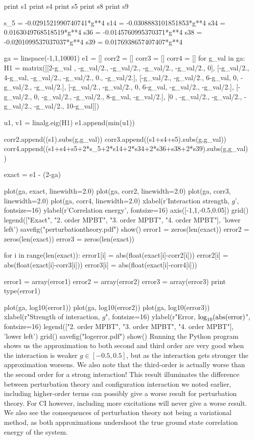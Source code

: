 \documentclass[%
twoside,                 %
final,                   %
10pt]{article}
\newenvironment{doconceexercise}{}{}
\begin{document}
\begin{doconceexercise}
print s1
print s4
print s5
print s8
print s9

s_5 =  -0.0291521990740741*g**4
s14 =  -0.0308883101851853*g**4
s34 =  0.0163049768518519*g**4
s36 =  -0.0145760995370371*g**4
s38 =  -0.0201099537037037*g**4
s39 =  0.0176938657407407*g**4

ga = linspace(-1,1,10001)
e1 = []
corr2 = []
corr3 = []
corr4 = []
for g_val in ga:
	H1 = matrix([[2-g_val , -g_val/2.,  -g_val/2., -g_val/2., -g_val/2.,     0], 
		        [-g_val/2.,   4-g_val,  -g_val/2., -g_val/2.,    0., -g_val/2.],
		        [-g_val/2., -g_val/2.,    6-g_val,     0, -g_val/2., -g_val/2.],
				[-g_val/2., -g_val/2.,      0,   6-g_val, -g_val/2., -g_val/2.],
				[-g_val/2.,     0,  -g_val/2., -g_val/2.,   8-g_val, -g_val/2.],
				[0    , -g_val/2.,  -g_val/2., -g_val/2., -g_val/2.,  10-g_val]]) 

	u1, v1 = linalg.eig(H1)
	e1.append(min(u1))

	corr2.append((s1).subs(g,g_val))
	corr3.append((s1+s4+s5).subs(g,g_val))
	corr4.append((s1+s4+s5+2*s_5+2*s14+2*s34+2*s36+s38+2*s39).subs(g,g_val))

exact = e1 - (2-ga)

plot(ga, exact, linewidth=2.0)
plot(ga, corr2, linewidth=2.0)
plot(ga, corr3, linewidth=2.0)
plot(ga, corr4, linewidth=2.0)
xlabel(r'Interaction strength, $g$', fontsize=16)
ylabel(r'Correlation energy', fontsize=16)
axis([-1,1,-0.5,0.05])
grid()
legend(["Exact", "2. order MPBT", "3. order MPBT", "4. order MPBT"], 'lower left')
savefig("perturbationtheory.pdf")
show()
error1 = zeros(len(exact))
error2 = zeros(len(exact))
error3 = zeros(len(exact))

for i in range(len(exact)):
	error1[i] = abs(float(exact[i]-corr2[i]))
	error2[i] = abs(float(exact[i]-corr3[i]))
	error3[i] = abs(float(exact[i]-corr4[i]))

error1 = array(error1)
error2 = array(error2)
error3 = array(error3)
print type(error1)

plot(ga, log10(error1))
plot(ga, log10(error2))
plot(ga, log10(error3))
xlabel(r"Strength of interaction, $g$", fontsize=16)
ylabel(r"Error, $\log_{\rm 10}({\rm abs}({\rm error})$", fontsize=16)
legend(["2. order MPBT", "3. order MPBT", "4. order MPBT"], 'lower left')
grid()
savefig("logerror.pdf")
show()
\epypro
Running the Python program shows us 
the approximation to both second and third order are very
good when the interaction is weaker $g\in[-0.5,0.5]$, but as the
interaction gets stronger the approximation worsens. We also
note that the third-order is actually worse than the second order for
a strong interaction! This result illuminates the difference between
perturbation theory and configuration interaction we noted earlier,
including higher-order terms can possibly give a worse result
for perturbation theory. For CI however, including more excitations
will never give a worse result. We also see the consequences of
perturbation theory not being a variational method, as both
approximations undershoot the true ground state correlation energy of
the system.


\end{doconceexercise}
\end{document}
